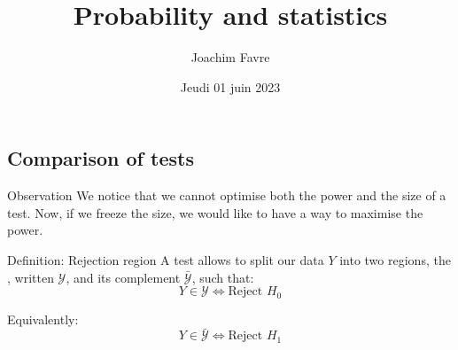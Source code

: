 \documentclass[a4paper]{article}
\title{Probability and statistics}
\author{Joachim Favre}
\date{Jeudi 01 juin 2023}
\begin{document}
\maketitle


\subsection{Comparison of tests}

\begin{parag}{Observation}
    We notice that we cannot optimise both the power and the size of a test. Now, if we freeze the size, we would like to have a way to maximise the power.
\end{parag}

\begin{parag}{Definition: Rejection region}
    A test allows to split our data $Y$ into two regions, the , written $\mathcal{Y}$, and its complement $\bar{\mathcal{Y}}$, such that: 
    \[Y \in \mathcal{Y} \iff \text{Reject $H_0$}\]

    Equivalently:
    \[Y \in \bar{\mathcal{Y}} \iff \text{Reject $H_1$}\]
\end{parag}
\end{document}
